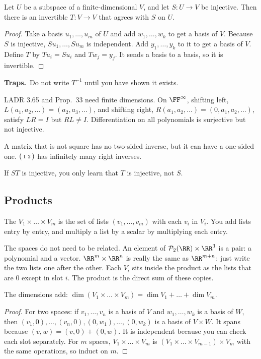 \documentclass[11pt]{scrartcl}
\newcommand{\PP}{\mathcal P}
\newcommand{\traps}{\par\medskip\noindent\textbf{\color{RawSienna}Traps.}\ }
\begin{document}
\begin{proposition*}[HW4 P7]
  Let $U$ be a subspace of a finite-dimensional $V$, and let $S\colon U\to V$ be injective.
  Then there is an invertible $T\colon V\to V$ that agrees with $S$ on $U$.
\end{proposition*}
\begin{proof}
  Take a basis $u_1,\dots,u_m$ of $U$ and add $w_1,\dots,w_k$ to get a basis of $V$.
  Because $S$ is injective, $Su_1,\dots,Su_m$ is independent. Add $y_1,\dots,y_k$ to it to get a basis of $V$.
  Define $T$ by $Tu_i=Su_i$ and $Tw_j=y_j$. It sends a basis to a basis, so it is invertible.
\end{proof}

\traps Do not write $T^{-1}$ until you have shown it exists.

LADR 3.65 and Prop.~33 need finite dimensions. On $\FF^\infty$, shifting left, $L(a_1,a_2,\dots)=(a_2,a_3,\dots)$, and shifting right, $R(a_1,a_2,\dots)=(0,a_1,a_2,\dots)$, satisfy $LR=I$ but $RL\ne I$. Differentiation on all polynomials is surjective but not injective.

A matrix that is not square has no two-sided inverse, but it can have a one-sided one. $\begin{psmallmatrix}1&2\end{psmallmatrix}$ has infinitely many right inverses.

If $ST$ is injective, you only learn that $T$ is injective, not $S$.

\subsection{Products}
\begin{definition*}
  The  $V_1\times\dots\times V_m$ is the set of lists $(v_1,\dots,v_m)$ with each $v_i$ in $V_i$.
  You add lists entry by entry, and multiply a list by a scalar by multiplying each entry.
\end{definition*}
The spaces do not need to be related. An element of $\PP_2(\RR)\times\RR^3$ is a pair: a polynomial and a vector.
$\RR^m\times\RR^n$ is really the same as $\RR^{m+n}$: just write the two lists one after the other.
Each $V_i$ sits inside the product as the lists that are $0$ except in slot $i$. The product is the direct sum of these copies.

\begin{proposition*}[Prop.~36]
  The dimensions add: $\dim(V_1\times\dots\times V_m)=\dim V_1+\dots+\dim V_m$.
\end{proposition*}
\begin{proof}
  For two spaces: if $v_1,\dots,v_n$ is a basis of $V$ and $w_1,\dots,w_k$ is a basis of $W$, then
  $(v_1,0),\dots,(v_n,0),(0,w_1),\dots,(0,w_k)$ is a basis of $V\times W$.
  It spans because $(v,w)=(v,0)+(0,w)$. It is independent because you can check each slot separately. For $m$ spaces, $V_1\times\dots\times V_m$ is $(V_1\times\dots\times V_{m-1})\times V_m$ with the same operations, so induct on $m$.
\end{proof}
\end{document}
